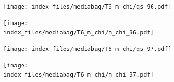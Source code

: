 \documentclass[
  11pt,
  letterpaper,
]{scrreprt}
\begin{document}
\begin{figure}

\begin{minipage}{0.50\linewidth}

\begin{figure}[H]

{\centering \texttt{[image: index\_files/mediabag/T6\_m\_chi/qs\_96.pdf]}

}


\end{figure}%

\end{minipage}%
%
\begin{minipage}{0.50\linewidth}

\begin{figure}[H]

{\centering \texttt{[image: index\_files/mediabag/T6\_m\_chi/m\_chi\_96.pdf]}

}


\end{figure}%

\end{minipage}%

\end{figure}%

\begin{figure}

\begin{minipage}{0.50\linewidth}

\begin{figure}[H]

{\centering \texttt{[image: index\_files/mediabag/T6\_m\_chi/qs\_97.pdf]}

}


\end{figure}%

\end{minipage}%
%
\begin{minipage}{0.50\linewidth}

\begin{figure}[H]

{\centering \texttt{[image: index\_files/mediabag/T6\_m\_chi/m\_chi\_97.pdf]}

}


\end{figure}%

\end{minipage}%

\end{figure}%
\end{document}

